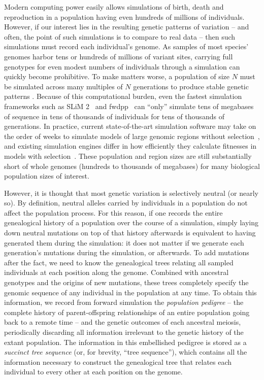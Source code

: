 \documentclass{article}
\begin{document}
Modern computing power easily allows simulations of birth, death and reproduction
in a population having even hundreds of millions of individuals.
However, if our interest lies in the resulting genetic patterns of variation
-- and often, the point of such simulations is to compare to real data --
then such simulations must record each individual's genome.
As samples of most species' genomes harbor tens or hundreds of millions of variant sites,
carrying full genotypes for even modest numbers of individuals through a simulation
can quickly become prohibitive.
To make matters worse,
a population of size $N$ must be simulated across many multiples of $N$ generations
to produce stable genetic patterns \citep{wright1931evolution, wakeley2005coalescent}.
Because of this computational burden, even the fastest simulation frameworks such as
SLiM 2~\citep{haller2017flexible} and fwdpp~\citep{fwdpp}
can ``only'' simulate tens of megabases of sequence in tens of thousands of individuals
for tens of thousands of generations.
In practice, current state-of-the-art simulation software may take on the order of
weeks to simulate models of large genomic regions without selection~\citep{fwdpp,Hernandez2015-wf},
and existing simulation engines differ in how efficiently they
calculate fitnesses in models with selection~\citep{fwdpp}.
These population and region sizes are still substantially short of whole genomes
(hundreds to thousands of megabases)
for many biological population sizes of interest.

However, it is thought that most genetic variation is selectively neutral (or nearly so).
By definition, neutral alleles carried by individuals in a population
do not affect the population process.
For this reason, if one records the entire genealogical history of a population over the course of a simulation,
simply laying down neutral mutations on top of that history afterwards
is equivalent to having generated them during the simulation:
it does not matter if we generate each generation's mutations during the simulation, or afterwards.
To add mutations after the fact, we need to know the genealogical trees relating all sampled individuals
at each position along the genome.
Combined with ancestral genotypes and the origins of new mutations,
these trees completely specify the genomic sequence of any individual in the population at any time.
To obtain this information, we record from forward simulation the \emph{population pedigree} --
the complete history of parent-offspring relationships of an entire population
going back to a remote time -- and the genetic outcomes of each ancestral meiosis,
periodically discarding all information irrelevant to the genetic history
of the extant population.
The information in this embellished pedigree is stored as a \emph{succinct tree sequence}
(or, for brevity, ``tree sequence''),
which contains all the information necessary
to construct the genealogical tree that relates each individual to every other
at each position on the genome.
\end{document}
